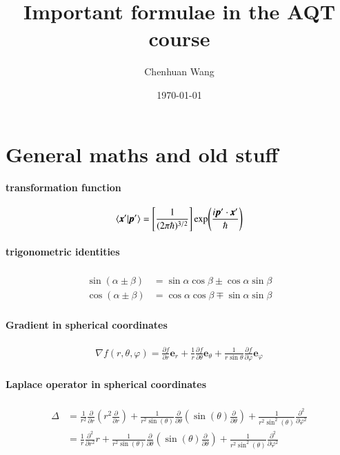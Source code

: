 

\author{Chenhuan Wang}
\title{Important formulae in the AQT course}
\date{\today}

\maketitle
\section{General maths and old stuff}
\paragraph{transformation function}
\begin{align}
	\braket{\pmb{x}'| \pmb{p}'} = \left[\frac{1}{(2\pi\hbar)^{3/2}}\right]\exp(\frac{i\pmb{p}'\cdot\pmb{x}'}{\hbar})
\end{align}
\paragraph{trigonometric identities}
\begin{align}
	\begin{split}
		\sin{(\alpha \pm \beta)} &= \sin{\alpha}\cos{\beta} \pm \cos{\alpha}\sin{\beta}\\
		\cos{(\alpha \pm \beta)} &= \cos{\alpha}\cos{\beta} \mp \sin{\alpha}\sin{\beta}
	\end{split}
\end{align}
\paragraph{Gradient in spherical coordinates}
\begin{align}
	\nabla f(r, \theta, \varphi) = \frac{\partial f}{\partial r}\mathbf{e}_r + \frac{1}{r}\frac{\partial f}{\partial \theta}\mathbf{e}_\theta + \frac{1}{r \sin\theta}\frac{\partial f}{\partial \varphi}\mathbf{e}_\varphi
\end{align}
\paragraph{Laplace operator in spherical coordinates}
\begin{align}
	\begin{split}
	\Delta &= \frac{1}{r^2}\frac{\partial}{\partial r} \left( r^2 \frac{\partial}{\partial r} \right) + \frac{1}{r^2 \sin(\theta)}\frac{\partial}{\partial \theta} \left( \sin(\theta) \frac{\partial}{\partial \theta} \right) + \frac{1}{r^2 \sin^2(\theta)}\frac{\partial^2}{\partial \varphi^2} \\
		&= 
	\frac{1}{r}\frac{\partial^2}{\partial r^2}r + \frac{1}{r^2 \sin(\theta)}\frac{\partial}{\partial \theta} \left( \sin(\theta) \frac{\partial}{\partial \theta} \right) + \frac{1}{r^2 \sin^2(\theta)}\frac{\partial^2}{\partial \varphi^2}
\end{split}
\end{align}
